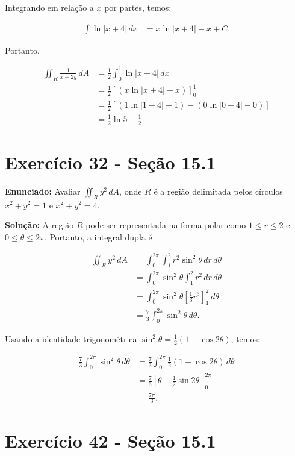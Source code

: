 \documentclass{article}
\begin{document}
Integrando em relação a $x$ por partes, temos:

\begin{align*}
\int \ln|x+4| \,dx &= x \ln|x+4| - x + C.
\end{align*}

Portanto,

\begin{align*}
\iint_R \frac{1}{x+2y}\,dA &= \frac{1}{2} \int_{0}^{1} \ln|x+4| \,dx \\
&= \frac{1}{2} \left[(x\ln|x+4| - x)\right]_{0}^{1} \\
&= \frac{1}{2} \left[(1\ln|1+4| - 1) - (0\ln|0+4| - 0)\right] \\
&= \boxed{\frac{1}{2} \ln 5 - \frac{1}{2}}.
\end{align*}
\section*{Exercício 32 - Seção 15.1}

\textbf{Enunciado:} Avaliar $\iint_R y^2 \,dA$, onde $R$ é a região delimitada pelos círculos $x^2+y^2=1$ e $x^2+y^2=4$.

\textbf{Solução:} A região $R$ pode ser representada na forma polar como $1 \leq r \leq 2$ e $0 \leq \theta \leq 2\pi$. Portanto, a integral dupla é

\begin{align*}
\iint_R y^2 \,dA &= \int_{0}^{2\pi} \int_{1}^{2} r^2\sin^2\theta \,dr\,d\theta \\
&= \int_{0}^{2\pi} \sin^2\theta \int_{1}^{2} r^2 \,dr\,d\theta \\
&= \int_{0}^{2\pi} \sin^2\theta \left[\frac{1}{3}r^3\right]_{1}^{2} \,d\theta \\
&= \frac{7}{3} \int_{0}^{2\pi} \sin^2\theta \,d\theta.
\end{align*}

Usando a identidade trigonométrica $\sin^2\theta = \frac{1}{2}(1-\cos2\theta)$, temos:

\begin{align*}
\frac{7}{3} \int_{0}^{2\pi} \sin^2\theta \,d\theta &= \frac{7}{3} \int_{0}^{2\pi} \frac{1}{2}(1-\cos2\theta) \,d\theta \\
&= \frac{7}{6} \left[\theta - \frac{1}{2}\sin2\theta\right]_{0}^{2\pi} \\
&= \boxed{\frac{7\pi}{3}}.
\end{align*}

\section*{Exercício 42 - Seção 15.1}
\end{document}

